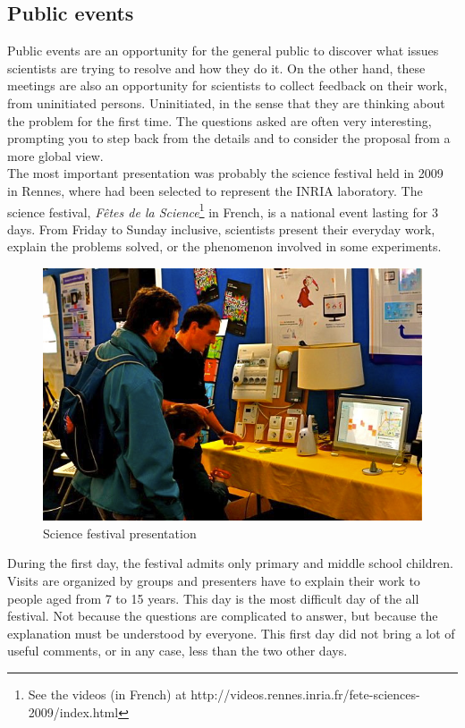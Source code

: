 \subsection{Public events}

Public events are an opportunity for the general public to discover what issues scientists are trying to resolve and how they do it. On the other hand, these meetings are also an opportunity for scientists to collect feedback on their work, from uninitiated persons. Uninitiated, in the sense that they are thinking about the problem for the first time. The questions asked are often very interesting, prompting you to step back from the details and to consider the proposal from a more global view.\\

The most important presentation was probably the science festival held in 2009 in Rennes, where \enti{} had been selected to represent the INRIA laboratory. The science festival, {\it Fêtes de la Science}\footnote{See the videos (in French) at http://videos.rennes.inria.fr/fete-sciences-2009/index.html} in French, is a national event lasting for 3 days. From Friday to Sunday inclusive, scientists present their everyday work, explain the problems solved, or the phenomenon involved in some experiments.

\begin{figure}
\includegraphics[width=\textwidth]{part4/pics/fdls.jpg}
\caption{Science festival presentation}
\end{figure}

During the first day, the festival admits only primary and middle school children. Visits are organized by groups and presenters have to explain their work to people aged from 7 to 15 years. This day is the most difficult day of the all festival. Not because the questions are complicated to answer, but because the explanation must be understood by everyone. This first day did not bring a lot of useful comments, or in any case, less than the two other days.\\

